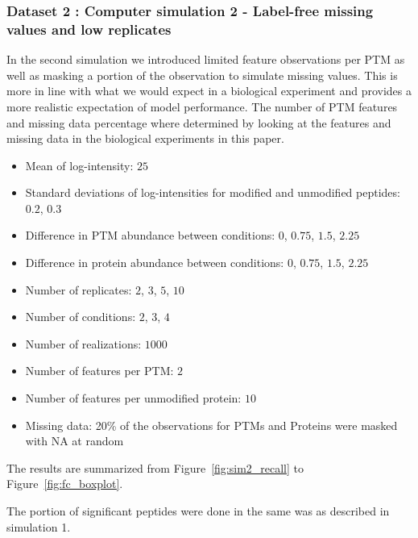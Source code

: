 \documentclass{mcp}
\def\sfigref#1{{Figure~\ref{#1}}}
\begin{document}
\subsubsection{Dataset 2 : Computer simulation 2 - Label-free missing values and low replicates}

In the second simulation we introduced limited feature observations per PTM as well as masking a portion of the observation to simulate missing values. This is more in line with what we would expect in a biological experiment and provides a more realistic expectation of model performance. The number of PTM features and missing data percentage where determined by looking at the features and missing data in the biological experiments in this paper.

\begin{itemize}
\item Mean of log-intensity: $25$
\item Standard deviations of log-intensities for modified and unmodified peptides: $0.2$, $0.3$
\item Difference in PTM abundance between conditions: $0$, $0.75$, $1.5$, $2.25$
\item Difference in protein abundance between conditions: $0$, $0.75$, $1.5$, $2.25$
\item Number of replicates: $2$, $3$, $5$, $10$
\item Number of conditions: $2$, $3$, $4$
\item Number of realizations: $1000$
\item Number of features per PTM: $2$
\item Number of features per unmodified protein: $10$
\item Missing data: 20\% of the observations for PTMs and Proteins were masked with NA at random
\end{itemize}

The results are summarized from \sfigref{fig:sim2_recall} to \sfigref{fig:fc_boxplot}.

The portion of significant peptides were done in the same was as described in simulation 1.
\end{document}
